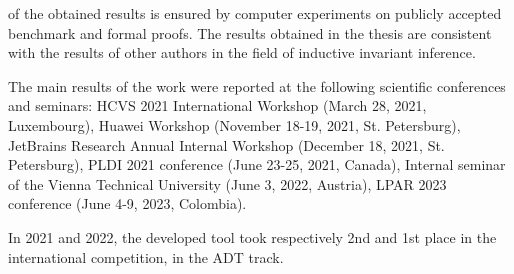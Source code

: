 
{\reliability} of the obtained results is ensured by computer experiments on publicly accepted benchmark and formal proofs.
The results obtained in the thesis are consistent with the results of other authors in the field of inductive invariant inference.


{\probation}
The main results of the work were reported at the following scientific conferences and seminars:
HCVS 2021 International Workshop (March 28, 2021, Luxembourg),
Huawei Workshop (November 18-19, 2021, St. Petersburg),
JetBrains Research Annual Internal Workshop (December 18, 2021, St. Petersburg),
PLDI 2021 conference (June 23-25, 2021, Canada),
Internal seminar of the Vienna Technical University (June 3, 2022, Austria),
LPAR 2023 conference (June 4-9, 2023, Colombia).

In 2021 and 2022, the developed tool took respectively 2nd and 1st place in the international \chccomp{} competition, in the ADT track.


